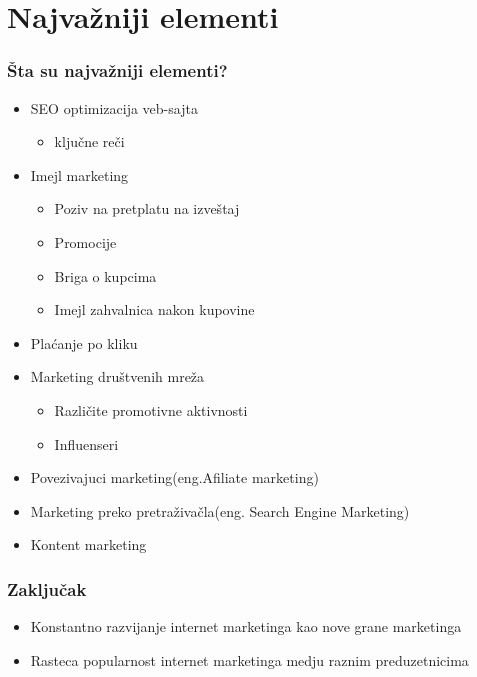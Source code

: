 \documentclass{beamer}
\begin{document}
\section{Najvažniji elementi}

\begin{frame}[fragile]\frametitle{ Šta su najvažniji elementi?}
	\begin{itemize}	
		\item SEO optimizacija veb-sajta 
		\begin{itemize}
		    \item \large  ključne reči
		\end{itemize}
			\item Imejl marketing
			\begin{itemize}
			    \item Poziv na pretplatu na izveštaj
			    \item Promocije
			    \item Briga o kupcima
			    \item Imejl zahvalnica nakon kupovine
			\end{itemize}
			\item Plaćanje po kliku
			\item Marketing društvenih mreža
			\begin{itemize}
			    \item Različite promotivne aktivnosti
			    \item Influenseri
			\end{itemize}
			\item Povezivajuci marketing(eng.Afiliate marketing)
			\item Marketing preko pretraživačla(eng. Search Engine Marketing)
        		\item Kontent marketing
	\end{itemize}
\end{frame}

\begin{frame}[fragile]\frametitle{Zaključak}
	\begin{itemize}
		\item Konstantno razvijanje internet marketinga kao nove grane marketinga
        \item Rasteca popularnost internet marketinga medju raznim preduzetnicima
	\end{itemize}
\end{frame}
\end{document}
